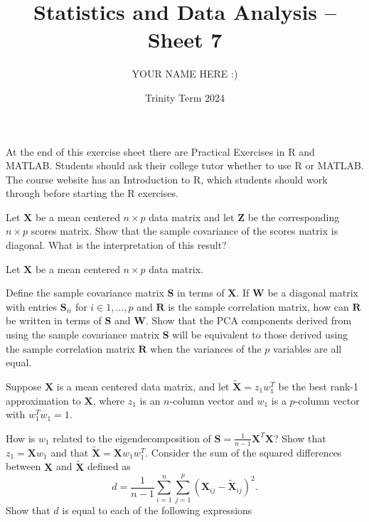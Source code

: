 \documentclass[answers]{exam}
\title{Statistics and Data Analysis -- Sheet 7}
\author{YOUR NAME HERE :)}
\date{Trinity Term 2024}
\begin{document}
\maketitle
At the end of this exercise sheet there are Practical Exercises in R and MATLAB. Students should ask their college tutor whether to use R or MATLAB. The course website has an Introduction to R, which students should work through before starting the R exercises.
\begin{questions}
\question%
Let $\mathbf{X}$ be a mean centered $n \times p$ data matrix and let $\mathbf{Z}$ be the corresponding $n \times p$ scores matrix. Show that the sample covariance of the scores matrix is diagonal. What is the interpretation of this result?



\question%
Let $\mathbf{X}$ be a mean centered $n \times p$ data matrix.
\begin{subparts}
\subpart Define the sample covariance matrix $\mathbf{S}$ in terms of $\mathbf{X}$.
\subpart If $\mathbf{W}$ be a diagonal matrix with entries $\mathbf{S}_{i i}$ for $i \in 1, \ldots, p$ and $\mathbf{R}$ is the sample correlation matrix, how can $\mathbf{R}$ be written in terms of $\mathbf{S}$ and $\mathbf{W}$.
\subpart Show that the PCA components derived from using the sample covariance matrix $\mathbf{S}$ will be equivalent to those derived using the sample correlation matrix $\mathbf{R}$ when the variances of the $p$ variables are all equal.
\end{subparts}



\question%
Suppose $\mathbf{X}$ is a mean centered data matrix, and let $\widetilde{\mathbf{X}}=z_{1} w_{1}^{T}$ be the best rank-1 approximation to $\mathbf{X}$, where $z_{1}$ is an $n$-column vector and $w_{1}$ is a $p$-column vector with $w_{1}^{T} w_{1}=1$.
\begin{subparts}
\subpart How is $w_{1}$ related to the eigendecomposition of $\mathbf{S}=\frac{1}{n-1} \mathbf{X}^{T} \mathbf{X}$?
\subpart Show that $z_{1}=\mathbf{X} w_{1}$ and that $\widetilde{\mathbf{X}}=\mathbf{X} w_{1} w_{1}^{T}$.
\subpart Consider the sum of the squared differences between $\mathbf{X}$ and $\widetilde{\mathbf{X}}$ defined as \[
	d=\frac{1}{n-1} \sum_{i=1}^{n} \sum_{j=1}^{p}\left(\mathbf{X}_{i j}-\widetilde{\mathbf{X}}_{i j}\right)^{2}.
\] Show that $d$ is equal to each of the following expressions
\end{subparts}
\end{questions}
\end{document}
